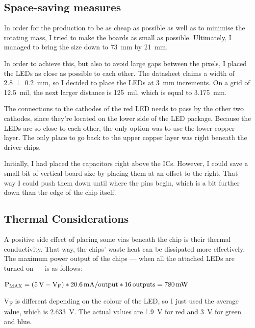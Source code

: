 \documentclass[a4paper, 11pt, titlepage]{report}
\newenvironment{ownmath}
{\vspace{2mm}\hspace{15pt}\begin{math}}
{\end{math}\vspace{2mm}}
\begin{document}
\subsection{Space-saving measures}

In order for the production to be as cheap as possible as well as to minimise the rotating mass, I
tried to make the boards as small as possible. Ultimately, I managed to bring the size down to
\SI{73}{\milli\meter} by \SI{21}{\milli\meter}.

In order to achieve this, but also to avoid large gaps between the pixels, I placed the LEDs as
close as possible to each other. The datasheet claims a width of \SI{2.8 +- 0.2}{\milli\meter},
so I decided to place the LEDs at \SI{3}{\milli\metre} increments. On a grid of \SI{12.5}{mil},
the next larger distance is \SI{125}{mil}, which is equal to \SI{3.175}{mm}.

The connections to the cathodes of the red LED needs to pass by the other two cathodes, since
they're located on the lower side of the LED package. Because the LEDs are so close to each other,
the only option was to use the lower copper layer. The only place to go back to the upper copper
layer was right beneath the driver chips.

Initially, I had placed the capacitors right above the ICs. However, I could save a small bit of
vertical board size by placing them at an offset to the right. That way I could push them down
until where the pins begin, which is a bit further down than the edge of the chip itself.


\subsection{Thermal Considerations}

A positive side effect of placing some vias beneath the chip is their thermal conductivity. That
way, the chips' waste heat can be dissipated more effectively. The maximum power output of the
chips --- when all the attached LEDs are turned on --- is as follows:

\begin{ownmath}
\textrm{P\textsubscript{MAX}} = (\SI{5}{\volt} - \textrm{V\textsubscript{F}}) *
\SI{20.6}{\milli\ampere\per output} * \SI{16}{outputs} = \SI{780}{\milli\watt}
\end{ownmath}

V\textsubscript{F} is different depending on the colour of the LED, so I just used the average
value, which is \SI{2.633}{\volt}. The actual values are \SI{1.9}{\volt} for red and \SI{3}{\volt}
for green and blue.
\end{document}
